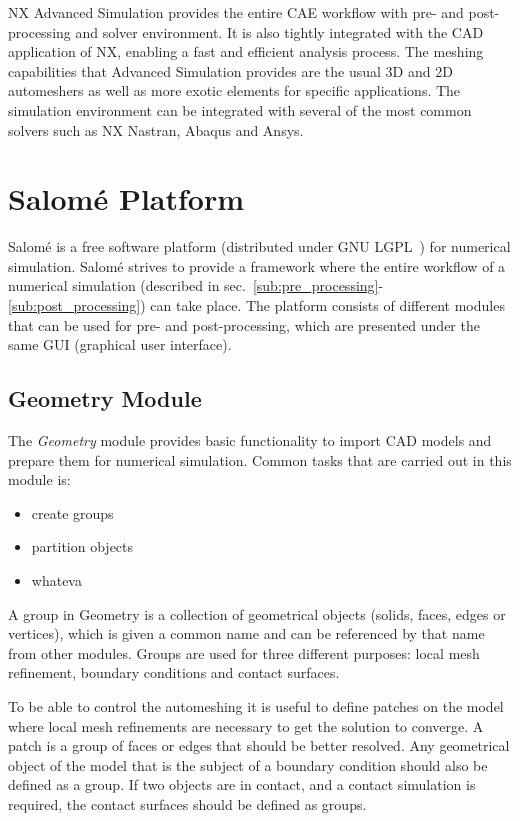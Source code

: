 NX Advanced Simulation provides the entire CAE workflow with pre- and post-processing and solver environment. It is also tightly integrated with the CAD application of NX, enabling a fast and efficient analysis process. The meshing capabilities that Advanced Simulation provides are the usual 3D and 2D automeshers as well as more exotic elements for specific applications. The simulation environment can be integrated with several of the most common solvers such as NX Nastran, Abaqus and Ansys.

\section{Salomé Platform} %
\label{sec:salom_platform}
Salomé is a free software platform (distributed under GNU LGPL~\cite{lgpl}) for numerical simulation. Salomé strives to provide a framework where the entire workflow of a numerical simulation (described in sec.~\ref{sub:pre_processing}-\ref{sub:post_processing}) can take place. The platform consists of different modules that can be used for pre- and post-processing, which are presented under the same GUI (graphical user interface).~\cite{ribes07} 

\subsection{Geometry Module} %
\label{sub:geometry_module}
The \textit{Geometry} module provides basic functionality to import CAD models and prepare them for numerical simulation. Common tasks that are carried out in this module is:
\begin{itemize}
 	\item create groups
 	\item partition objects
 	\item whateva
\end{itemize}

A group in Geometry is a collection of geometrical objects (solids, faces, edges or vertices), which is given a common name and can be referenced by that name from other modules. Groups are used for three different purposes: local mesh refinement, boundary conditions and contact surfaces.

To be able to control the automeshing it is useful to define patches on the model where local mesh refinements are necessary to get the solution to converge. A patch is a group of faces or edges that should be better resolved. Any geometrical object of the model that is the subject of a boundary condition should also be defined as a group. If two objects are in contact, and a contact simulation is required, the contact surfaces should be defined as groups.

